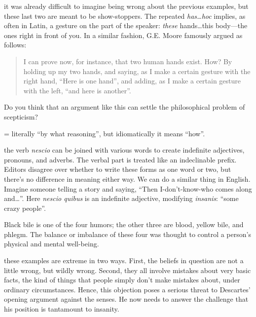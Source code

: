  it was already difficult to imagine being wrong about the previous examples, but these last two are meant to be show-stoppers. The repeated \textit{has\dots hoc} implies, as often in Latin, a gesture on the part of the speaker: \textit{these} hands\dots this body---the ones right in front of you. In a similar fashion, G.E. Moore \cite[165--166]{baldwin1993} famously argued as follows:
\begin{quote}
    I can prove now, for instance, that two human hands exist. How? By holding up my two hands, and saying, as I make a certain gesture with the right hand, ``Here is one hand'', and adding, as I make a certain gesture with the left, ``and here is another''.
\end{quote}
Do you think that an argument like this can settle the philosophical problem of scepticism?

 = literally ``by what reasoning'', but idiomatically it means ``how''.

 the verb \textit{nescio} can be joined with various words to create indefinite adjectives, pronouns, and adverbs. The verbal part is treated like an indeclinable prefix. Editors disagree over whether to write these forms as one word or two, but there's no difference in meaning either way. We can do a similar thing in English. Imagine someone telling a story and saying, ``Then I-don't-know-who comes along and\dots''. Here \textit{nescio quibus} is an indefinite adjective, modifying \textit{insanis}: ``some crazy people''.

 Black bile is one of the four humors; the other three are blood, yellow bile, and phlegm. The balance or imbalance of these four was thought to control a person's physical and mental well-being.

 these examples are extreme in two ways. First, the beliefs in question are not a little wrong, but wildly wrong. Second, they all involve mistakes about very basic facts, the kind of things that people simply don't make mistakes about, under ordinary circumstances. Hence, this objection poses a serious threat to Descartes' opening argument against the senses. He now needs to answer the challenge that his position is tantamount to insanity.

\clearpage

